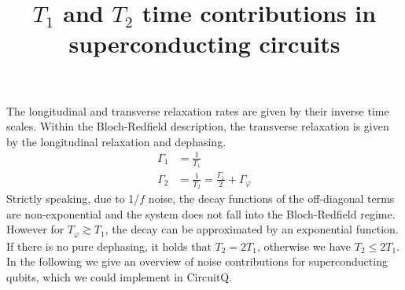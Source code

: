 \documentclass[]{article}
\title{$T_1$ and $T_2$ time contributions in superconducting circuits}
\date{} %
\begin{document}
	\maketitle
The longitudinal and transverse relaxation rates are given by their inverse time scales. Within the Bloch-Redfield description, the transverse relaxation is given by the longitudinal relaxation and dephasing.~\cite{krantz2019}
\begin{align}
\Gamma_1 &= \frac{1}{T_1} \\
\Gamma_2 &= \frac{1}{T_2} =  \frac{\Gamma_1}{2} + \Gamma_{\varphi}  
\end{align}
Strictly speaking, due to 1/$f$ noise, the decay functions of the off-diagonal terms are non-exponential and the system does not fall into the Bloch-Redfield regime. However for $T_{\varphi}   \gtrsim T_1$, the decay can be approximated by an exponential function. If there is no pure dephasing, it holds that $T_2 = 2T_1$, otherwise we have $T_2 \leq 2 T_1$. 
In the following we give an overview of noise contributions for superconducting qubits, which we could implement in CircuitQ.
\end{document}
